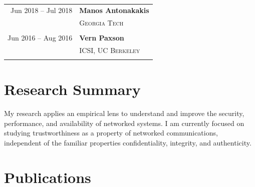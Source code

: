 \documentclass[10pt]{article} %
\begin{document}
{\begin{minipage}[t]{0.44\textwidth}
\begin{tabular}{rl}
Jun 2018 -- Jul 2018 & \textbf{Manos Antonakakis}\\
& \textsc{Georgia Tech}\\
&\\

Jun 2016 -- Aug 2016 & \textbf{Vern Paxson}\\
& \textsc{ICSI, UC Berkeley}\\
& \\

\end{tabular}


%
%	
\end{minipage} %
\hfill
\begin{minipage}[t]{0.5\textwidth} %
\vspace{0pt} %
	

\section{Research Summary} 

My research applies an empirical lens to understand and improve the security,
performance, and availability of networked systems. I am currently focused on
studying trustworthiness as a property of networked communications, independent
of the familiar properties confidentiality, integrity, and authenticity. \\

\section{Publications} 


\end{minipage}}
\end{document}
